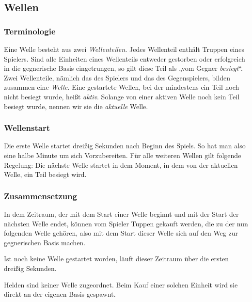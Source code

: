 \subsection{Wellen}

\subsubsection{Terminologie}

Eine Welle besteht aus zwei \emph{Wellenteilen.} Jedes Wellenteil enthält
Truppen eines Spielers.  Sind alle Einheiten eines Wellenteils entweder
gestorben oder erfolgreich in die gegnerische Basis eingetrungen, so gilt diese Teil als „vom Gegner \emph{besiegt}“.
\\
Zwei Wellenteile, nämlich das des Spielers und das des Gegenspielers, bilden
zusammen eine \emph{Welle.} Eine gestartete Wellen, bei der mindestens ein Teil
noch nicht besiegt wurde, heißt \emph{aktiv}.
Solange von einer aktiven Welle noch kein Teil besiegt wurde, nennen wir sie die \emph{aktuelle} Welle.


\subsubsection{Wellenstart}

Die erste Welle startet dreißig Sekunden nach Beginn des Spiels. So hat man also eine halbe Minute um sich Vorzubereiten.
Für alle weiteren Wellen gilt folgende Regelung: Die nächste Welle startet in dem Moment, in dem von der aktuellen Welle, ein Teil besiegt wird.


\subsubsection{Zusammensetzung}

In dem Zeitraum, der mit dem Start einer Welle beginnt und mit der Start der
nächsten Welle endet, können vom Spieler Tuppen gekauft werden, die zu der nun
folgenden Welle gehören, also mit dem Start dieser Welle sich auf den Weg zur
gegnerischen Basis machen.

Ist noch keine Welle gestartet worden, läuft dieser Zeitraum über die ersten
dreißig Sekunden.

Helden sind keiner Welle zugeordnet. Beim Kauf einer solchen Einheit wird sie
direkt an der eigenen Basis gespawnt.
